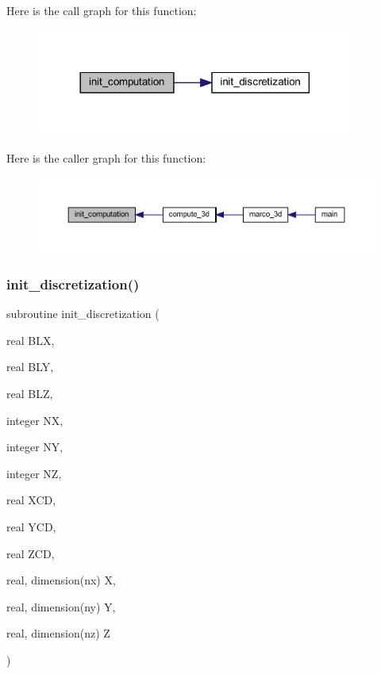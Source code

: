 Here is the call graph for this function\+:
\nopagebreak
\begin{figure}[H]
\begin{center}
\leavevmode
\includegraphics[width=296pt]{Marco_8f90_a5f04384a88b1293a8d2dc26d86a77d08_cgraph}
\end{center}
\end{figure}
Here is the caller graph for this function\+:
\nopagebreak
\begin{figure}[H]
\begin{center}
\leavevmode
\includegraphics[width=350pt]{Marco_8f90_a5f04384a88b1293a8d2dc26d86a77d08_icgraph}
\end{center}
\end{figure}
\mbox{\label{Marco_8f90_aca2a0c5479ec07e65782fa62da433365}} 
\subsubsection{\texorpdfstring{init\+\_\+discretization()}{init\_discretization()}}
{\footnotesize\ttfamily subroutine init\+\_\+discretization (\begin{DoxyParamCaption}\item[{real}]{B\+LX,  }\item[{real}]{B\+LY,  }\item[{real}]{B\+LZ,  }\item[{integer}]{NX,  }\item[{integer}]{NY,  }\item[{integer}]{NZ,  }\item[{real}]{X\+CD,  }\item[{real}]{Y\+CD,  }\item[{real}]{Z\+CD,  }\item[{real, dimension(nx)}]{X,  }\item[{real, dimension(ny)}]{Y,  }\item[{real, dimension(nz)}]{Z }\end{DoxyParamCaption})}

